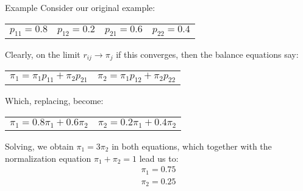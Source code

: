 \documentclass[aspectratio=169]{beamer}
\begin{document}
\begin{frame}{Example}
    Consider our original example:
    {    
        \centering
        \begin{tabular}{cccc}
            $p_{11}=0.8$ & $p_{12}=0.2$ & $p_{21}=0.6$ & $p_{22}=0.4$
        \end{tabular}
    }

    Clearly, on the limit $r_{ij}\rightarrow \pi_j$ if this converges, then the balance equations say:
    \begin{center}
    \begin{tabular}{cc}
        $\pi_1=\pi_1 p_{11}+\pi_2 p_{21}$ & $\pi_2=\pi_1 p_{12}+\pi_2 p_{22}$    
    \end{tabular}
    \end{center}

    Which, replacing, become:

    \begin{center}
    \begin{tabular}{cc}
        $\pi_1= 0.8 \pi_1 + 0.6 \pi_2$ & $\pi_2=0.2 \pi_1+0.4 \pi_2$    
    \end{tabular}
    \end{center}

    Solving, we obtain $\pi_1=3\pi_2$ in both equations, which together with the normalization equation
    $\pi_1+\pi_2=1$ lead us to:
    \begin{align*}
        \pi_1=0.75\\
        \pi_2=0.25
    \end{align*}

\end{frame}
\end{document}
